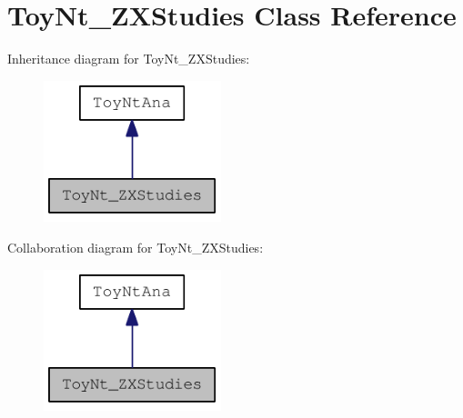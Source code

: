 \hypertarget{classToyNt__ZXStudies}{
\section{ToyNt\_\-ZXStudies Class Reference}
\label{classToyNt__ZXStudies}
}
Inheritance diagram for ToyNt\_\-ZXStudies:\nopagebreak
\begin{figure}[H]
\begin{center}
\leavevmode
\includegraphics[width=146pt]{classToyNt__ZXStudies__inherit__graph}
\end{center}
\end{figure}
Collaboration diagram for ToyNt\_\-ZXStudies:\nopagebreak
\begin{figure}[H]
\begin{center}
\leavevmode
\includegraphics[width=146pt]{classToyNt__ZXStudies__coll__graph}
\end{center}
\end{figure}
